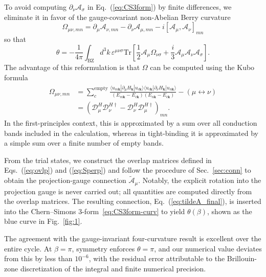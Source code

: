 \documentclass[galley,aps,pra,10pt,amsmath,amssymb,
    superscriptaddress,nofootinbib,longbibliography]{revtex4-2}
\newcounter{comm}
\newcommand{\eq}[1]{Eq.~(\ref{eq:#1})}
\newcommand{\eqs}[2]{Eqs.~(\ref{eq:#1}) and (\ref{eq:#2})}
\begin{document}
To avoid computing $\partial_\nu \mathcal{A}_\sigma$ in \eq{CS3form} by finite differences, we eliminate it in favor of the gauge-covariant non-Abelian Berry curvature
\begin{equation}
    \Omega_{\mu\nu, mn} = \partial_{\mu} \mathcal{A}_{\nu, mn} - \partial_{\nu} \mathcal{A}_{\mu,mn} - i[\mathcal{A}_\mu, \mathcal{A}_{\nu}]_{mn}
   \end{equation}
so that
\begin{equation}
\label{eq:CS3form-curv}
    \theta = -\frac{1}{4\pi} \int_{\text{BZ}} d^3 k\, \varepsilon^{\mu\nu\sigma} \text{Tr}\left[ \frac{1}{2}\mathcal{A}_{\mu}\Omega_{\nu\sigma} + \frac{i}{3} \mathcal{A}_\mu \mathcal{A}_\nu \mathcal{A}_\sigma\right].
\end{equation}
The advantage of this reformulation is that $\Omega$ can be computed using the Kubo formula
\begin{align}
\label{eq:bc-def}
    \Omega_{\mu\nu, mn} &=\sum_{c}^{\mathrm{empty}} \frac{\langle u_{m\mathbf{k}}|\partial_{\mu} H_{\mathbf{k}}|u_{c\mathbf{k}}\rangle \langle u_{c\mathbf{k}}|\partial_{\nu} H_{\mathbf{k}}|u_{n\mathbf{k}}\rangle}{(E_{m\mathbf{k}}-E_{c\mathbf{k}})(E_{n\mathbf{k}} -E_{c\mathbf{k}})} - (\mu \leftrightarrow \nu) \\ &= (\mathcal{D}^H_\mu \mathcal{D}_\nu^{H\dagger} - \mathcal{D}^H_\nu \mathcal{D}_\mu^{H\dagger})_{mn}.
\end{align}
In the first-principles context, this is approximated by a sum over all conduction bands included in the calculation, whereas in tight-binding it is approximated by a simple sum over a finite number of empty bands. 

From the trial states, we construct the overlap matrices defined in \eqs{ovlp}{Sperp} and follow the procedure of Sec.~\ref{sec:conn} to obtain the projection-gauge connection $\tilde{\mathcal{A}}_\mu$. Notably, the explicit rotation into the projection gauge is never carried out; all quantities are computed directly from the overlap matrices. The resulting connection, \eq{tildeA_final}, is inserted into the Chern--Simons 3-form~\eqref{eq:CS3form-curv} to yield $\theta(\beta)$, shown as the blue curve in Fig.~\ref{fig:1}.

The agreement with the gauge-invariant four-curvature result is excellent over the entire cycle. At $\beta=\pi$, symmetry enforces $\theta=\pi$, and our numerical value deviates from this by less than $10^{-6}$, with the residual error attributable to the Brillouin-zone discretization of the integral and finite numerical precision.
\end{document}
